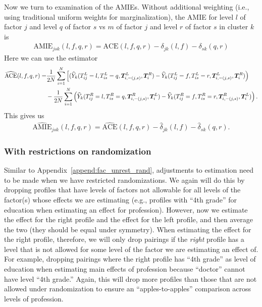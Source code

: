 Now we turn to examination of the AMIEs.  Without additional weighting
(i.e., using traditional uniform weights for marginalization), the
AMIE for level $l$ of factor $j$ and level $q$ of factor $s$ vs $m$ of
factor $j$ and level $r$ of factor $s$ in cluster $k$ is
\begin{align*}
\text{AMIE}_{jsk}(l,f, q, r) =\text{ACE}(l,f, q, r) -\delta_{jk}(l,f)-\delta_{sk}(q,r)
\end{align*}
Here we can use the estimator
  \begin{align*}
 \widehat{ \text{ACE}}(l,f, q, r)=
&\frac{1}{2N}\sum_{i=1}^N\left[(\widehat{Y}_k(T^L_{ij}=l, T^L_{is}=q, \bm{T}^L_{i,-(j,s)}, \bm{T}^R_{i} ) - \widehat{Y}_k(T^L_{ij}=f, T^L_{is}=r, \bm{T}^L_{i,-(j,s)}, \bm{T}^R_{i} )\right)\\
&-\frac{1}{2N}\sum_{i=1}^N\left(\widehat{Y}_k(T^R_{ij}=l, T^R_{is}=q, \bm{T}^R_{i,-(j,s)}, \bm{T}^L_{i} )  -\widehat{Y}_k(T^R_{ij}=f, T^R_{is}=r, \bm{T}^R_{i,-(j,s)}, \bm{T}^L_{i} )\right).
\end{align*}
This gives us
\begin{align*}
\widehat{\text{AMIE}}_{jsk}(l,f, q, r) =\widehat{\text{ACE}}(l,f, q, r) -\widehat{\delta}_{jk}(l,f)-\widehat{\delta}_{sk}(q,r).
\end{align*}


\subsubsection{With restrictions on randomization}
\label{append:con_rest_rand}

Similar to Appendix~\ref{append:fac_unrest_rand}, adjustments to
estimation need to be made when we have restricted randomizations.  We
again will do this by dropping profiles that have levels of factors
not allowable for all levels of the factor(s) whose effects we are
estimating (e.g., profiles with ``4th grade'' for education when
estimating an effect for profession).  However, now we estimate the
effect for the right profile and the effect for the left profile, and
then average the two (they should be equal under symmetry).  When
estimating the effect for the right profile, therefore, we will only
drop pairings if the \textit{right} profile has a level that is not
allowed for some level of the factor we are estimating an effect of.
For example, dropping pairings where the right profile has ``4th
grade'' as level of education when estimating main effects of
profession because ``doctor'' cannot have level ``4th grade.''  Again,
this will drop more profiles than those that are not allowed under
randomization to ensure an ``apples-to-apples'' comparison across
levels of profession.

